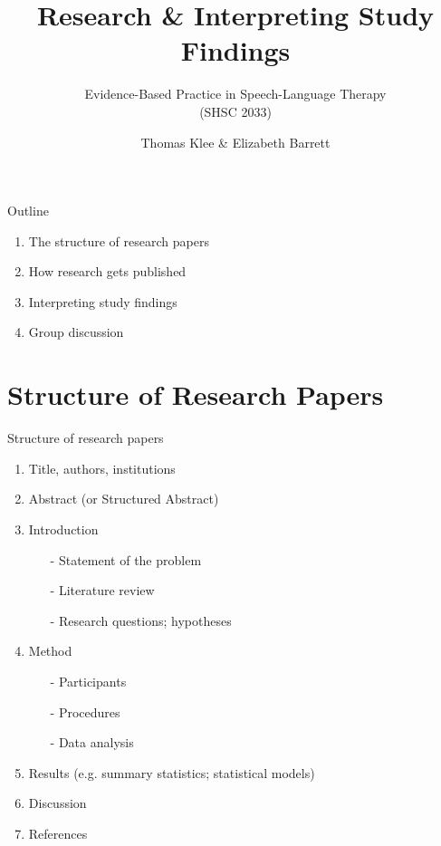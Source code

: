 \documentclass{beamer}
\title{Research \& Interpreting Study Findings}
\subtitle{}
\author{Evidence-Based Practice in Speech-Language Therapy \\ (SHSC 2033)}
\institute{Session 2}
\date{Thomas Klee \& Elizabeth Barrett}
\begin{document}
\begin{frame}
	\titlepage
\end{frame}

% 
\begin{frame}{Outline}
	\begin{enumerate}
	\item The structure of research papers
	\item How research gets published
	\item Interpreting study findings
	\item Group discussion
	\end {enumerate}
\end{frame}

\section*{Structure of Research Papers}

%
\begin{frame}
\center{\Huge{\textcolor{darkgray}{Structure of Research Papers}}}
\end{frame}

% 
\begin{frame}{Structure of research papers}
	\begin{enumerate}
	\item {Title, authors, institutions}
	\item Abstract (or Structured Abstract)
	\item Introduction
		\begin {itemize}
		\item[-] Statement of the problem
		\item[-] Literature review
		\item[-] Research questions; hypotheses
		\end{itemize}
	\item Method
		\begin{itemize}
		\item[-] Participants
		\item[-] Procedures
		\item[-] Data analysis
		\end{itemize}
	\item Results (e.g. summary statistics; statistical models)
	\item Discussion
	\item References
	\end{enumerate}
\end{frame} 
\end{document}
